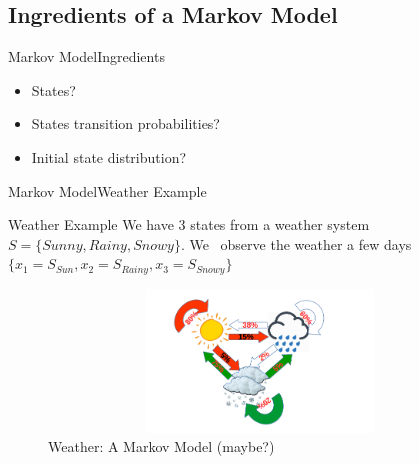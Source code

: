 \documentclass[10pt]{beamer}
\begin{document}
\subsection{Ingredients of a Markov Model}
\begin{frame}{Markov Model}{Ingredients}
  \begin{itemize}
    \item States?
    \item States transition probabilities?
    \item Initial state distribution? 
  \end{itemize}
\end{frame}

\begin{frame}{Markov Model}{Weather Example}
  \begin{block}{Weather Example}
     We have 3 states from a weather system $S = \{Sunny, Rainy, Snowy\}$. We \
     observe the weather a few days \
     $\{x_1 = S_{Sun}, x_2 = S_{Rainy}, x_3 = S_{Snowy}\}$
  \end{block}
  \begin{figure}[h]
    \centering
    \includegraphics[width=4.5in,height=1.5in]{figures/weather_example.png}
    \caption {Weather: A Markov Model (maybe?)}
  \end{figure}
\end{frame}

\end{document}
